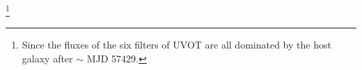 









\footnote{Since the fluxes of the six filters of UVOT are all dominated by the host galaxy after $\sim$ MJD 57429.}